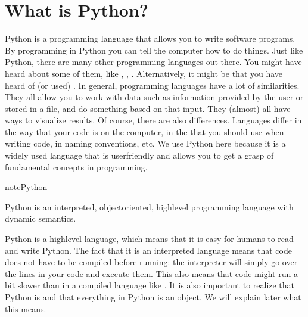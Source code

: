 \documentclass[letterpaper,10pt,english]{jupyterBook}
\begin{document}
\section{What is Python?}
\label{\detokenize{notebooks/01_GettingStarted/01_GettingStarted_student:what-is-python}}
\sphinxAtStartPar
Python is a programming language that allows you to write software programs. By programming in Python you can tell the computer how to do things. Just like Python, there are many other programming languages out there. You might have heard about some of them, like , , . Alternatively, it might be that you have heard of (or used) . In general, programming languages have a lot of similarities. They all allow you to work with data such as information provided by the user or stored in a file, and do something based on that input. They (almost) all have ways to visualize results. Of course, there are also differences. Languages differ in the way that your code is  on the computer, in the  that you should use when writing code, in naming conventions, etc. We use Python here because it is a widely used language that is user\sphinxhyphen{}friendly and allows you to get a grasp of fundamental concepts in programming.

\begin{sphinxadmonition}{note}{Python}

\sphinxAtStartPar
Python is an interpreted, object\sphinxhyphen{}oriented, high\sphinxhyphen{}level programming language with dynamic semantics.
\end{sphinxadmonition}

\sphinxAtStartPar
Python is a high\sphinxhyphen{}level language, which means that it is easy for humans to read and write Python. The fact that it is an interpreted language means that code does not have to be compiled before running: the interpreter will simply go over the lines in your code and execute them. This also means that code might run a bit slower than in a compiled language like . It is also important to realize that Python is  and that everything in Python is an object. We will explain later what this means.
\end{document}
